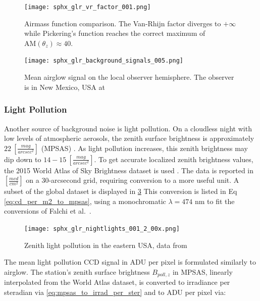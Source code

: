 \begin{figure}[ht]
  \centering
  \texttt{[image: sphx\_glr\_vr\_factor\_001.png]}
  \caption{Airmass function comparison. The Van-Rhijn factor diverges to $+\infty$ while Pickering's function reaches the correct maximum of $\textrm{AM}(\theta_z) \approx 40$.}
  \label{fig:airmass_fcns}
\end{figure}

\begin{figure}[ht]
  \centering
  \texttt{[image: sphx\_glr\_background\_signals\_005.png]}
  \caption{Mean airglow signal on the local observer hemisphere. The observer is in New Mexico, USA at
  \pogslla}
  \label{fig:airglowhemi}
\end{figure}

\subsubsection{Light Pollution}

Another source of background noise is light pollution. On a cloudless night with low levels of atmospheric aerosols, 
the zenith surface brightness is approximately $22 \: \left[ \frac{mag}{arcsec^2}
\right]$ (MPSAS) \cite{krag2003}. As light pollution increases, this zenith brightness may dip down to
$14-15 \: \left[ \frac{mag}{arcsec^2} \right]$. To get accurate localized zenith brightness values,
 the 2015 World Atlas of Sky Brightness dataset is used \cite{falchi2016_data}. The data is reported in $\left[
	\frac{mcd}{cm^2} \right]$ on a 30-arcsecond grid, requiring conversion to a more useful unit. A subset of the global dataset is displayed in \ref{fig:pollution_data} This conversion is listed in Eq \ref{eq:cd_per_m2_to_mpsas}, using a monochromatic $\lambda = 474$ nm to fit the conversions of Falchi et al.\ \cite{falchi2016}.  

\begin{figure}[ht]
  \centering
  \texttt{[image: sphx\_glr\_nightlights\_001\_2\_00x.png]}
  \caption{Zenith light pollution in the eastern USA, data from \cite{falchi2016_data}}
  \label{fig:pollution_data}
\end{figure}

The mean light pollution CCD signal in ADU per pixel is formulated similarly to airglow. The station's zenith surface brightness $B_{poll,z}$ in MPSAS, linearly interpolated from the World Atlas dataset, is converted to irradiance per steradian via \ref{eq:mpsas_to_irrad_per_ster} and to ADU per pixel via:
 
